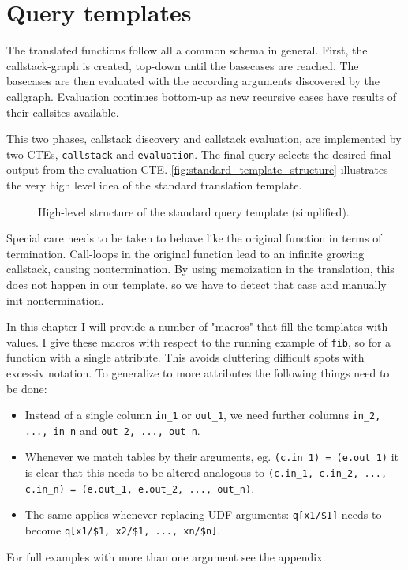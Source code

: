 \chapter{Query templates}\label{template}

The translated functions follow all a common schema in general. First, the callstack-graph is created, top-down until the basecases are reached. The basecases are then evaluated with the according arguments discovered by the callgraph. Evaluation continues bottom-up as new recursive cases have results of their callsites available.

This two phases, callstack discovery and callstack evaluation, are implemented by two CTEs, \texttt{callstack} and \texttt{evaluation}. The final query selects the desired final output from the evaluation-CTE. \autoref{fig:standard_template_structure} illustrates the very high level idea of the standard translation template.

\begin{figure}[h!]
    \centering
    \caption{High-level structure of the standard query template (simplified).}
    \label{fig:standard_template_structure}
\end{figure}

Special care needs to be taken to behave like the original function in terms of termination. Call-loops in the original function lead to an infinite growing callstack, causing nontermination. By using memoization in the translation, this does not happen in our template, so we have to detect that case and manually init nontermination.

In this chapter I will provide a number of "macros" that fill the templates with values. I give these macros with respect to the running example of \texttt{fib}, so for a function with a single attribute. This avoids cluttering difficult spots with excessiv notation. To generalize to more attributes the following things need to be done:
\begin{itemize}
    \item Instead of a single column \texttt{in\_1} or \texttt{out\_1}, we need further columns \texttt{in\_2, ..., in\_n} and \texttt{out\_2, ..., out\_n}.
    \item Whenever we match tables by their arguments, eg. \texttt{(c.in\_1) = (e.out\_1)} it is clear that this needs to be altered analogous to \texttt{(c.in\_1, c.in\_2, ..., c.in\_n) = (e.out\_1, e.out\_2, ..., out\_n)}.
    \item The same applies whenever replacing UDF arguments: \texttt{q[x1/\$1]} needs to become \texttt{q[x1/\$1, x2/\$1, ..., xn/\$n]}.
\end{itemize}
For full examples with more than one argument see the appendix. 

